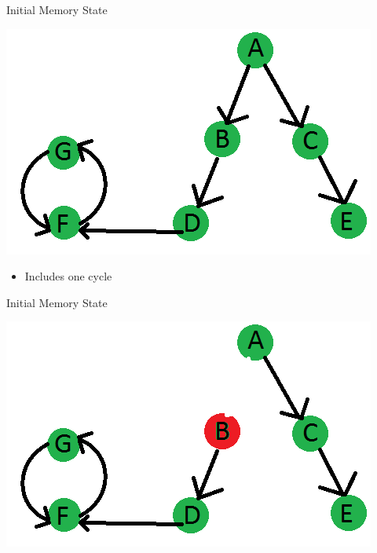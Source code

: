 \documentclass{beamer}
\begin{document}
\begin{frame}{Initial Memory State}
	\begin{center}
		\includegraphics[width=\textwidth]{graphics/memState0.png}
	\end{center}
	\begin{itemize}
		\item Includes one cycle
	\end{itemize}
\end{frame}
\begin{frame}{Initial Memory State}
	\begin{center}
		\includegraphics[width=\textwidth]{graphics/memState1.png}
	\end{center}
\end{frame}
\end{document}
